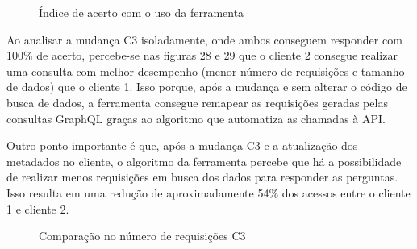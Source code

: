 \begin{figure}[H]
  \centering
  \caption{Índice de acerto com o uso da ferramenta}
\end{figure}

Ao analisar a mudança C3 isoladamente, onde ambos conseguem responder com 100\% de acerto, percebe-se nas figuras 28 e 29 que o cliente 2 consegue realizar uma consulta com melhor desempenho (menor número de requisições e tamanho de dados) que o cliente 1. Isso porque, após a mudança e sem alterar o código de busca de dados, a ferramenta consegue remapear as requisições geradas pelas consultas GraphQL graças ao algoritmo que automatiza as chamadas à API.

Outro ponto importante é que, após a mudança C3 e a atualização dos metadados no cliente, o algoritmo da ferramenta percebe que há a possibilidade de realizar menos requisições em busca dos dados para responder as perguntas. Isso resulta em uma redução de aproximadamente 54\% dos acessos entre o cliente 1 e cliente 2.

\begin{figure}[H]
  \centering
  \caption{Comparação no número de requisições C3}
\end{figure}

